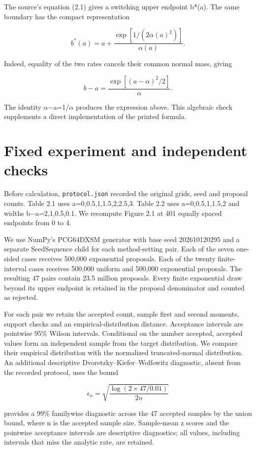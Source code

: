 The source's equation (2.1) gives a switching upper endpoint b*(a). The same boundary has the compact representation

\[
b^*(a)=a+\frac{\exp[1/(2\alpha(a)^2)]}{\alpha(a)}.
\]

Indeed, equality of the two rates cancels their common normal mass, giving

\[
b-a=\frac{\exp[(a-\alpha)^2/2]}{\alpha}.
\]

The identity $\alpha$$-$a=1/$\alpha$ produces the expression above. This algebraic check supplements a direct implementation of the printed formula.

\section{Fixed experiment and independent checks}

Before calculation, \texttt{protocol.\allowbreak{}json} recorded the original grids, seed and proposal counts. Table 2.1 uses a=0,0.5,1,1.5,2,2.5,3. Table 2.2 uses a=0,0.5,1,1.5,2 and widths b$-$a=2,1,0.5,0.1. We recompute Figure 2.1 at 401 equally spaced endpoints from 0 to 4.

We use NumPy's PCG64DXSM generator with base seed 202610120295 and a separate SeedSequence child for each method-setting pair. Each of the seven one-sided cases receives 500,000 exponential proposals. Each of the twenty finite-interval cases receives 500,000 uniform and 500,000 exponential proposals. The resulting 47 pairs contain 23.5 million proposals. Every finite exponential draw beyond its upper endpoint is retained in the proposal denominator and counted as rejected.

For each pair we retain the accepted count, sample first and second moments, support checks and an empirical-distribution distance. Acceptance intervals are pointwise 95\% Wilson intervals. Conditional on the number accepted, accepted values form an independent sample from the target distribution. We compare their empirical distribution with the normalized truncated-normal distribution. An additional descriptive Dvoretzky–Kiefer–Wolfowitz diagnostic, absent from the recorded protocol, uses the bound \cite{massart1990}

\[
\epsilon_n=\sqrt{\frac{\log(2\times47/0.01)}{2n}}
\]

provides a 99\% familywise diagnostic across the 47 accepted samples by the union bound, where n is the accepted sample size. Sample-mean z scores and the pointwise acceptance intervals are descriptive diagnostics; all values, including intervals that miss the analytic rate, are retained.

